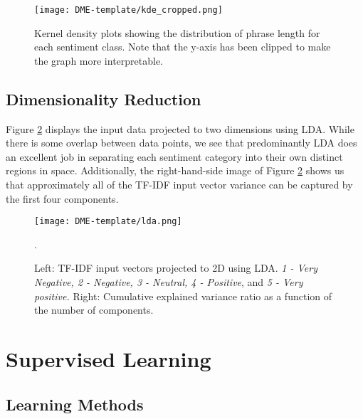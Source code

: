 \documentclass{article}
\begin{document}
\begin{figure}[h]
    \centering
    \texttt{[image: DME-template/kde\_cropped.png]}
    \caption{Kernel density plots showing the distribution of phrase length for each sentiment class. Note that the y-axis has been clipped to make the graph more interpretable.}
    \label{fig:kde}
\end{figure}

\subsection{Dimensionality Reduction}
Figure \ref{fig:lda} displays the input data projected to two dimensions using LDA. While there is some overlap between data points, we see that predominantly LDA does an excellent job in separating each sentiment category into their own distinct regions in space. Additionally, the right-hand-side image of Figure \ref{fig:lda} shows us that approximately all of the TF-IDF input vector variance can be captured by the first four components.  

\begin{figure}[h]
    \setlength{\belowcaptionskip}{-10pt}
    \centering
    \texttt{[image: DME-template/lda.png]}
    \caption{Left: TF-IDF input vectors projected to 2D using LDA. \textit{1 - Very Negative, 2 - Negative, 3 - Neutral, 4 - Positive}, and \textit{5 - Very positive.} Right: Cumulative explained variance ratio as a function of the number of components.}. 
    \label{fig:lda}
\end{figure}

\section{Supervised Learning}
\label{SL}

\subsection{Learning Methods}
\end{document}

